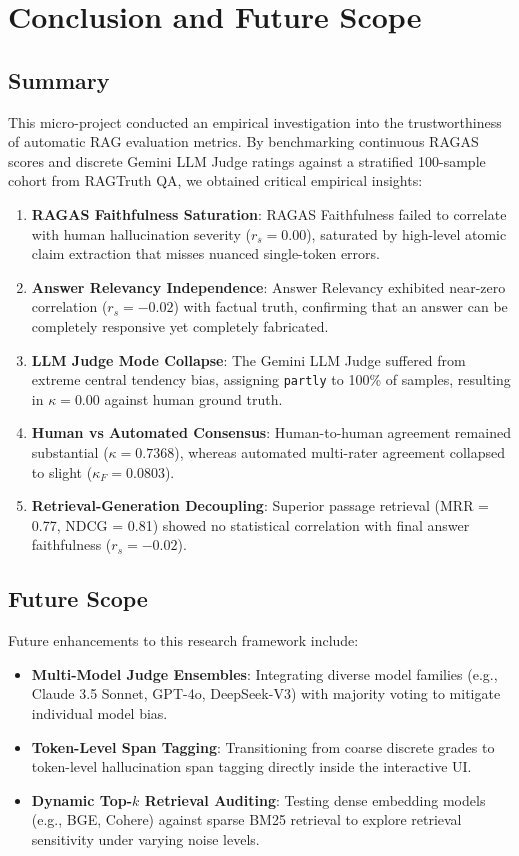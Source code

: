 \documentclass[11pt,a4paper]{article}
\begin{document}
\section{Conclusion and Future Scope}

\subsection{Summary}
This micro-project conducted an empirical investigation into the trustworthiness of automatic RAG evaluation metrics. By benchmarking continuous RAGAS scores and discrete Gemini LLM Judge ratings against a stratified 100-sample cohort from RAGTruth QA, we obtained critical empirical insights:
\begin{enumerate}[leftmargin=*]
    \item \textbf{RAGAS Faithfulness Saturation}: RAGAS Faithfulness failed to correlate with human hallucination severity ($r_s = 0.00$), saturated by high-level atomic claim extraction that misses nuanced single-token errors.
    \item \textbf{Answer Relevancy Independence}: Answer Relevancy exhibited near-zero correlation ($r_s = -0.02$) with factual truth, confirming that an answer can be completely responsive yet completely fabricated.
    \item \textbf{LLM Judge Mode Collapse}: The Gemini LLM Judge suffered from extreme central tendency bias, assigning \texttt{partly} to 100\% of samples, resulting in $\kappa = 0.00$ against human ground truth.
    \item \textbf{Human vs Automated Consensus}: Human-to-human agreement remained substantial ($\kappa = 0.7368$), whereas automated multi-rater agreement collapsed to slight ($\kappa_F = 0.0803$).
    \item \textbf{Retrieval-Generation Decoupling}: Superior passage retrieval (MRR = 0.77, NDCG = 0.81) showed no statistical correlation with final answer faithfulness ($r_s = -0.02$).
\end{enumerate}

\subsection{Future Scope}
Future enhancements to this research framework include:
\begin{itemize}[leftmargin=*]
    \item \textbf{Multi-Model Judge Ensembles}: Integrating diverse model families (e.g., Claude 3.5 Sonnet, GPT-4o, DeepSeek-V3) with majority voting to mitigate individual model bias.
    \item \textbf{Token-Level Span Tagging}: Transitioning from coarse discrete grades to token-level hallucination span tagging directly inside the interactive UI.
    \item \textbf{Dynamic Top-$k$ Retrieval Auditing}: Testing dense embedding models (e.g., BGE, Cohere) against sparse BM25 retrieval to explore retrieval sensitivity under varying noise levels.
\end{itemize}
\end{document}
